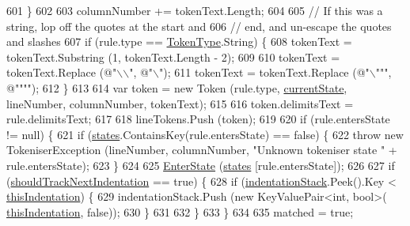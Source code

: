\begin{DoxyCode}
601                     \}
602 
603                     columnNumber += tokenText.Length;
604 
605                     \textcolor{comment}{// If this was a string, lop off the quotes at the start and}
606                     \textcolor{comment}{// end, and un-escape the quotes and slashes}
607                     \textcolor{keywordflow}{if} (rule.type == \hyperlink{a00041_a301aa7c866593a5b625a8fc158bbeace}{TokenType}.String) \{
608                         tokenText = tokenText.Substring (1, tokenText.Length - 2);
609 
610                         tokenText = tokenText.Replace (\textcolor{stringliteral}{@"\(\backslash\)\(\backslash\)"}, \textcolor{stringliteral}{@"\(\backslash\)"});
611                         tokenText = tokenText.Replace (\textcolor{stringliteral}{@"\(\backslash\)"""}, \textcolor{stringliteral}{@""""});
612                     \}
613 
614                     var token = \textcolor{keyword}{new} Token (rule.type, \hyperlink{a00117_ac90b7dce8103425a148f9e8588f14137}{currentState}, lineNumber, columnNumber, 
      tokenText);
615 
616                     token.delimitsText = rule.delimitsText;
617 
618                     lineTokens.Push (token);
619 
620                     \textcolor{keywordflow}{if} (rule.entersState != null) \{
621                         \textcolor{keywordflow}{if} (\hyperlink{a00117_a2c65c0ba90f973e459583badefef216a}{states}.ContainsKey(rule.entersState) == \textcolor{keyword}{false}) \{
622                             \textcolor{keywordflow}{throw} \textcolor{keyword}{new} TokeniserException (lineNumber, columnNumber, \textcolor{stringliteral}{"Unknown tokeniser
       state "} + rule.entersState);
623                         \}
624 
625                         \hyperlink{a00117_ad3ef08f822b310d9864774b057b96995}{EnterState} (\hyperlink{a00117_a2c65c0ba90f973e459583badefef216a}{states} [rule.entersState]);
626 
627                         \textcolor{keywordflow}{if} (\hyperlink{a00117_ac670aac2245cbd4694dfbd5b69313218}{shouldTrackNextIndentation} == \textcolor{keyword}{true}) \{
628                             \textcolor{keywordflow}{if} (\hyperlink{a00117_a6631a1b1a9109258ab18927e7587ff9b}{indentationStack}.Peek().Key < 
      \hyperlink{a00330_a0e59365a4aa5811f6495b92a51e23573}{thisIndentation}) \{
629                                 indentationStack.Push (\textcolor{keyword}{new} KeyValuePair<int, bool>(
      \hyperlink{a00330_a0e59365a4aa5811f6495b92a51e23573}{thisIndentation}, \textcolor{keyword}{false}));
630                             \}
631 
632                         \}
633                     \}
634 
635                     matched = \textcolor{keyword}{true};

\end{DoxyCode}
